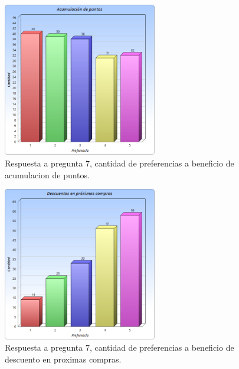 \begin{figure}[!htb]
  \centering
  \includegraphics[width=0.6\textwidth]{images/Graficos/graf_5_6.png}
  \caption[chart5.6]{Respuesta a pregunta $7$, cantidad de preferencias a beneficio de acumulacion de puntos.}
  \label{fig:chart5.6}
\end{figure}

\begin{figure}[!htb]
  \centering
  \includegraphics[width=0.6\textwidth]{images/Graficos/graf_5_7.png}
  \caption[chart5.7]{Respuesta a pregunta $7$, cantidad de preferencias a beneficio de descuento en 
proximas compras.}
  \label{fig:chart5.7}
\end{figure}

